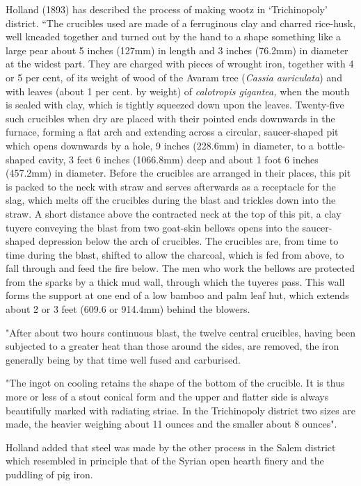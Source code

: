 Holland (1893) has described the process of making wootz in ‘Trichinopoly’ district. “The crucibles used are made of a ferruginous clay and charred rice-husk, well kneaded together and turned out by the hand to a shape something like a large pear about 5 inches (127mm) in length and 3 inches (76.2mm) in diameter at the widest part. They are charged with pieces of wrought iron, together with 4 or 5 per cent, of its weight of wood of the Avaram tree (\textit{Cassia auriculata}) and with leaves (about 1 per cent. by weight) of \textit{calotropis gigantea,} when the mouth is sealed with clay, which is tightly squeezed down upon the leaves. Twenty-five such crucibles when dry are placed with their pointed ends downwards in the furnace, forming a flat arch and extending across a circular, saucer-shaped pit which opens downwards by a hole, 9 inches (228.6mm) in diameter, to a bottle- shaped cavity, 3 feet 6 inches (1066.8mm) deep and about 1 foot 6 inches (457.2mm) in diameter. Before the crucibles are arranged in their places, this pit is packed to the neck with straw and serves afterwards as a receptacle for the slag, which melts off the crucibles during the blast and trickles down into the straw. A short distance above the contracted neck at the top of this pit, a clay tuyere conveying the blast from two goat-skin bellows opens into the saucer-shaped depression below the arch of crucibles. The crucibles are, from time to time during the blast, shifted to allow the charcoal, which is fed from above, to fall through and feed the fire below. The men who work the bellows are protected from the sparks by a thick mud wall, through which the tuyeres pass. This wall forms the support at one end of a low bamboo and palm leaf hut, which extends about 2 or 3 feet (609.6 or 914.4mm) behind the blowers.

"After about two hours continuous blast, the twelve central crucibles, having been subjected to a greater heat than those around the sides, are removed, the iron generally being by that time well fused and carburised.

"The ingot on cooling retains the shape of the bottom of the crucible. It is thus more or less of a stout conical form and the upper and flatter side is always beautifully marked with radiating striae. In the Trichinopoly district two sizes are made, the heavier weighing about 11 ounces and the smaller about 8 ounces".

Holland added that steel was made by the other process in the Salem district which resembled in principle that of the Syrian open hearth finery and the puddling of pig iron.

